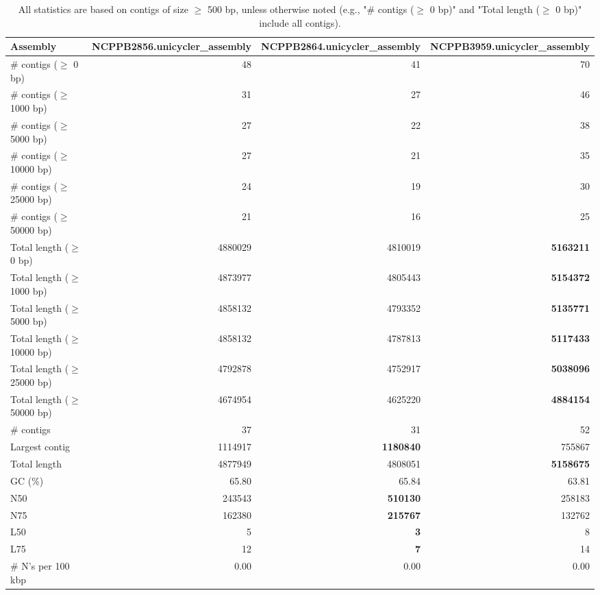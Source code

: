 \documentclass[12pt,a4paper]{article}
\begin{document}
\begin{table}[ht]
\begin{center}
\caption{All statistics are based on contigs of size $\geq$ 500 bp, unless otherwise noted (e.g., "\# contigs ($\geq$ 0 bp)" and "Total length ($\geq$ 0 bp)" include all contigs).}
\begin{tabular}{|l*{3}{|r}|}
\hline
Assembly & NCPPB2856.unicycler\_assembly & NCPPB2864.unicycler\_assembly & NCPPB3959.unicycler\_assembly \\ \hline
\# contigs ($\geq$ 0 bp) & 48 & 41 & 70 \\ \hline
\# contigs ($\geq$ 1000 bp) & 31 & 27 & 46 \\ \hline
\# contigs ($\geq$ 5000 bp) & 27 & 22 & 38 \\ \hline
\# contigs ($\geq$ 10000 bp) & 27 & 21 & 35 \\ \hline
\# contigs ($\geq$ 25000 bp) & 24 & 19 & 30 \\ \hline
\# contigs ($\geq$ 50000 bp) & 21 & 16 & 25 \\ \hline
Total length ($\geq$ 0 bp) & 4880029 & 4810019 & {\bf 5163211} \\ \hline
Total length ($\geq$ 1000 bp) & 4873977 & 4805443 & {\bf 5154372} \\ \hline
Total length ($\geq$ 5000 bp) & 4858132 & 4793352 & {\bf 5135771} \\ \hline
Total length ($\geq$ 10000 bp) & 4858132 & 4787813 & {\bf 5117433} \\ \hline
Total length ($\geq$ 25000 bp) & 4792878 & 4752917 & {\bf 5038096} \\ \hline
Total length ($\geq$ 50000 bp) & 4674954 & 4625220 & {\bf 4884154} \\ \hline
\# contigs & 37 & 31 & 52 \\ \hline
Largest contig & 1114917 & {\bf 1180840} & 755867 \\ \hline
Total length & 4877949 & 4808051 & {\bf 5158675} \\ \hline
GC (\%) & 65.80 & 65.84 & 63.81 \\ \hline
N50 & 243543 & {\bf 510130} & 258183 \\ \hline
N75 & 162380 & {\bf 215767} & 132762 \\ \hline
L50 & 5 & {\bf 3} & 8 \\ \hline
L75 & 12 & {\bf 7} & 14 \\ \hline
\# N's per 100 kbp & 0.00 & 0.00 & 0.00 \\ \hline
\end{tabular}
\end{center}
\end{table}
\end{document}
